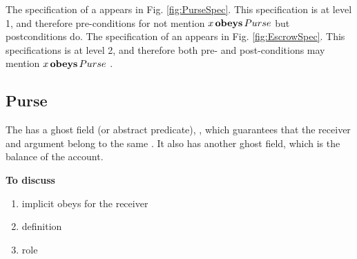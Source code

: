 
The specification of  a  appears in Fig. \ref{fig:PurseSpec}. This specification is at level 1, and therefore pre-conditions for not mention $x\, \textbf{obeys} \, Purse$ but postconditions do.
The specification of  an   appears in Fig. \ref{fig:EscrowSpec}. This specifications is at level 2, and therefore both pre- and post-conditions may mention  $x\, \textbf{obeys} \, Purse$ .

\newcommand{\sMT}{sellerM} 
\newcommand{\bMT}{buyerM}
\newcommand{\sGT}{sellerG} 
\newcommand{\bGT}{buyerG}
\newcommand{\sM}{\prg{\sMT}}
\newcommand{\bM}{\prg{\bMT}}
\newcommand{\sG}{\prg{\sGT}}
\newcommand{\bG}{\prg{\sGT}}


\subsection{Purse}

The  has a ghost field (or abstract predicate), , which guarantees that the receiver and argument belong to the same .  It also has another ghost field, which is the balance of the account.

\textbf{To discuss} \begin{enumerate}
\item
implicit obeys for the receiver
\item
{} definition
\item
{} role
\end{enumerate}

